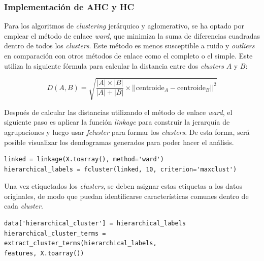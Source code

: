 \newpage

\subsubsection*{Implementación de \gls{AHC} y \gls{HC}}

Para los algoritmos de \textit{clustering} jerárquico y aglomerativo, se ha optado por emplear el método de enlace \textit{ward}, que minimiza la suma de diferencias cuadradas dentro de todos los \textit{clusters}. Este método es menos susceptible a ruido y \textit{outliers} en comparación con otros métodos de enlace como el completo o el simple. Este utiliza la siguiente fórmula para calcular la distancia entre dos \textit{clusters} \(A\) y \(B\):

\[
    D(A,B) = \sqrt{\frac{|A| \times |B|}{|A| + |B|} \times ||\text{centroide}_A - \text{centroide}_B||^2}
\]

Después de calcular las distancias utilizando el método de enlace \textit{ward}, el siguiente paso es aplicar la función \textit{linkage} para construir la jerarquía de agrupaciones y luego usar \textit{fcluster} para formar los \textit{clusters}. De esta forma, será posible visualizar los dendogramas generados para poder hacer el análisis.

\begin{center}
    \begin{mdframed}
    \footnotesize
            \begin{verbatim}
linked = linkage(X.toarray(), method='ward') 
hierarchical_labels = fcluster(linked, 10, criterion='maxclust')
            \end{verbatim}
    \end{mdframed}
\end{center}

Una vez etiquetados los \textit{clusters}, se deben asignar estas etiquetas a los datos originales, de modo que puedan identificarse características comunes dentro de cada \textit{cluster}.

\begin{center}
    \begin{mdframed}
    \footnotesize
            \begin{verbatim}
data['hierarchical_cluster'] = hierarchical_labels
hierarchical_cluster_terms = extract_cluster_terms(hierarchical_labels, 
features, X.toarray())
            \end{verbatim}
    \end{mdframed}
\end{center}


